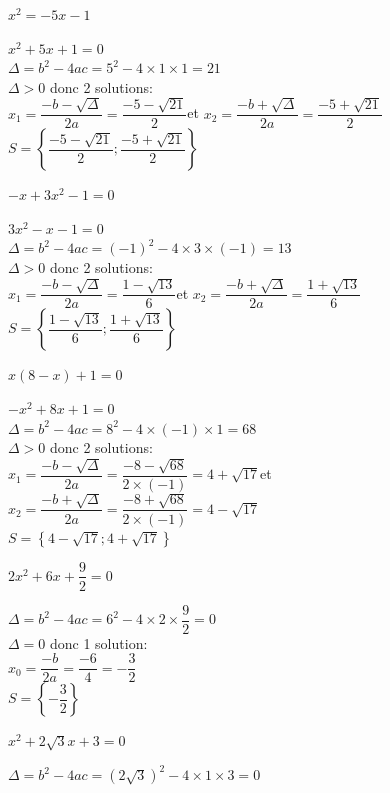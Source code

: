 \documentclass[11pt,a4paper]{article}  %
\begin{document}
\begin{enumMet}
\begin{corrBox}
	\end{corrBox}
	\item $x^2=-5 x-1$
	\begin{corrBox}
		$x^2+5x+1=0$\\
		$\Delta=b^2-4ac=5^2-4\times1\times1=21$\\
		$\Delta>0$ donc 2 solutions:\\
		$x_1=\dfrac{-b-\sqrt{\Delta}}{2a}=\dfrac{-5-\sqrt{21}}{2}$\quad et \quad $x_2=\dfrac{-b+\sqrt{\Delta}}{2a}=\dfrac{-5+\sqrt{21}}{2}$\\
		$S=\left\{\dfrac{-5-\sqrt{21}}{2};\dfrac{-5+\sqrt{21}}{2}\right\}$
	\end{corrBox}
	\item $-x+3 x^2-1=0$
	\begin{corrBox}
		$3x^2-x-1=0$\\
		$\Delta=b^2-4ac=(-1)^2-4\times3\times(-1)=13$\\
		$\Delta>0$ donc 2 solutions:\\
		$x_1=\dfrac{-b-\sqrt{\Delta}}{2a}=\dfrac{1-\sqrt{13}}{6}$\quad et \quad $x_2=\dfrac{-b+\sqrt{\Delta}}{2a}=\dfrac{1+\sqrt{13}}{6}$\\
		$S=\left\{\dfrac{1-\sqrt{13}}{6};\dfrac{1+\sqrt{13}}{6}\right\}$
	\end{corrBox}
	\item $x(8-x)+1=0$
	\begin{corrBox}
		$-x^2+8x+1=0$\\
		$\Delta=b^2-4ac=8^2-4\times(-1)\times1=68$\\
		$\Delta>0$ donc 2 solutions:\\
		$x_1=\dfrac{-b-\sqrt{\Delta}}{2a}=\dfrac{-8-\sqrt{68}}{2\times (-1)}=4+\sqrt{17}$\quad et \quad $x_2=\dfrac{-b+\sqrt{\Delta}}{2a}=\dfrac{-8+\sqrt{68}}{2\times (-1)}=4-\sqrt{17}$\\
		$S=\left\{4-\sqrt{17};4+\sqrt{17}\right\}$
	\end{corrBox}
	\item $2 x^2+6 x+\dfrac{9}{2}=0$
	\begin{corrBox}
		$\Delta=b^2-4ac=6^2-4\times2\times\dfrac{9}{2}=0$\\
		$\Delta=0$ donc 1 solution:\\
		$x_0=\dfrac{-b}{2a}=\dfrac{-6}{4}=-\dfrac{3}{2}$\\
		$S=\left\{-\dfrac{3}{2}\right\}$
	\end{corrBox}
	\item $x^2+2 \sqrt{3} x+3=0$
	\begin{corrBox}
		$\Delta=b^2-4ac=(2 \sqrt{3})^2-4\times1\times3=0$\\

\end{corrBox}
\end{enumMet}
\end{document}
